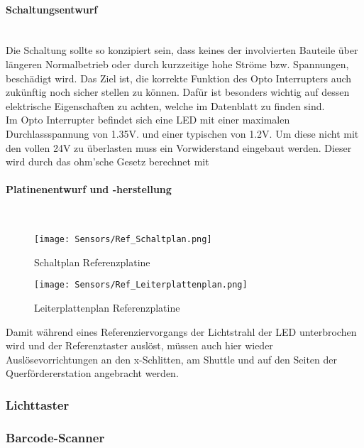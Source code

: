 \paragraph{Schaltungsentwurf} \mbox{}\\
Die Schaltung sollte so konzipiert sein, dass keines der involvierten Bauteile über längeren Normalbetrieb oder durch kurzzeitige hohe Ströme bzw. Spannungen, beschädigt wird. Das Ziel ist, die korrekte Funktion des Opto Interrupters auch zukünftig noch sicher stellen zu können. Dafür ist besonders wichtig auf dessen elektrische Eigenschaften zu achten, welche im Datenblatt zu finden sind.\\
Im Opto Interrupter befindet sich eine LED mit einer maximalen Durchlassspannung von 1.35V. und einer typischen von 1.2V. Um diese nicht mit den vollen 24V zu überlasten muss ein Vorwiderstand eingebaut werden. Dieser wird durch das ohm'sche Gesetz berechnet mit 

\paragraph{Platinenentwurf und -herstellung} \mbox{}\\

\begin{figure}[H]
    \centering
    \texttt{[image: Sensors/Ref\_Schaltplan.png]}
    \caption{Schaltplan Referenzplatine}
    \label{Ref_Schaltplan}
\end{figure}

\begin{figure}[H]
    \centering
    \texttt{[image: Sensors/Ref\_Leiterplattenplan.png]}
    \caption{Leiterplattenplan Referenzplatine}
    \label{Ref_LPPlan}
\end{figure}

Damit während eines Referenziervorgangs der Lichtstrahl der LED unterbrochen wird und der Referenztaster auslöst, müssen auch hier wieder Auslösevorrichtungen an den x-Schlitten, am Shuttle und auf den Seiten der Querfördererstation angebracht werden.

\subsubsection{Lichttaster}

\subsubsection{Barcode-Scanner}

